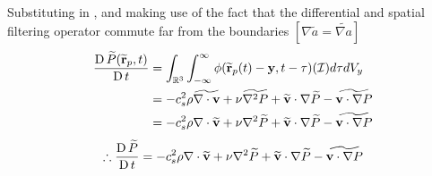 Substituting  in , and making use of the fact that the differential and spatial filtering operator commute far from the boundaries $[\nabla \widetilde{a} = \widetilde{\nabla a}]$ \parencite{DiMascio2017}
\begin{equation}
    \begin{split}
        \frac{\operatorname{D} \widetilde{P}(\widetilde{\mathbf{r}}_p, t)}{\operatorname{D} t} & = \int_{\mathbb{R}^3} \int_{-\infty}^{\infty} \phi (\widetilde{\mathbf{r}}_p(t)-\mathbf{y}, t-\tau) (\mathcal{I}) d \tau d V_y \\
        & = -c_s^2 \rho \widetilde{\nabla \cdot \mathbf{v}} + \nu \widetilde{\nabla^2 P} + \widetilde{\mathbf{v}} \cdot \nabla \widetilde{P} - \widetilde{\mathbf{v} \cdot \nabla P} \\
        & = -c_s^2 \rho \nabla \cdot \widetilde{\mathbf{v}} + \nu \nabla^2 \widetilde{P}  + \widetilde{\mathbf{v}} \cdot \nabla \widetilde{P} - \widetilde{\mathbf{v} \cdot \nabla P}
    \end{split}
\end{equation}
\begin{equation}
    \therefore \frac{\operatorname{D} \widetilde{P}}{\operatorname{D} t} = -c_s^2 \rho \nabla \cdot \widetilde{\mathbf{v}} + \nu \nabla^2 \widetilde{P} + \widetilde{\mathbf{v}} \cdot \nabla \widetilde{P} - \widetilde{\mathbf{v}\cdot\nabla P}
\end{equation}